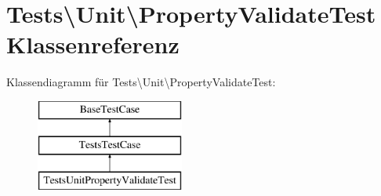 \hypertarget{classTests_1_1Unit_1_1PropertyValidateTest}{}\section{Tests\textbackslash{}Unit\textbackslash{}Property\+Validate\+Test Klassenreferenz}
\label{classTests_1_1Unit_1_1PropertyValidateTest}
Klassendiagramm für Tests\textbackslash{}Unit\textbackslash{}Property\+Validate\+Test\+:\begin{figure}[H]
\begin{center}
\leavevmode
\includegraphics[height=3.000000cm]{d9/d68/classTests_1_1Unit_1_1PropertyValidateTest}
\end{center}
\end{figure}
